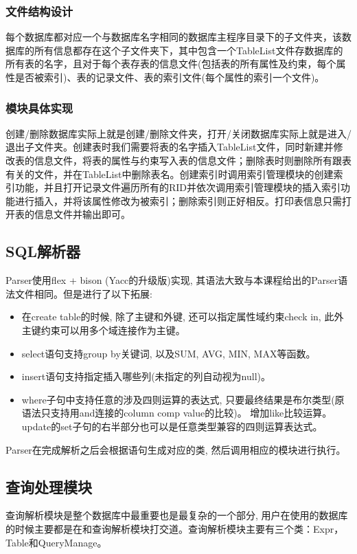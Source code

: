 \documentclass[11pt,UTF8]{report}
\begin{document}
\subsubsection{文件结构设计}

每个数据库都对应一个与数据库名字相同的数据库主程序目录下的子文件夹，该数据库的所有信息都存在这个子文件夹下，其中包含一个TableList文件存数据库的所有表的名字，且对于每个表存表的信息文件(包括表的所有属性及约束，每个属性是否被索引)、表的记录文件、表的索引文件(每个属性的索引一个文件)。
\subsubsection{模块具体实现}

创建/删除数据库实际上就是创建/删除文件夹，打开/关闭数据库实际上就是进入/退出子文件夹。创建表时我们需要将表的名字插入TableList文件，同时新建并修改表的信息文件，将表的属性与约束写入表的信息文件；删除表时则删除所有跟表有关的文件，并在TableList中删除表名。创建索引时调用索引管理模块的创建索引功能，并且打开记录文件遍历所有的RID并依次调用索引管理模块的插入索引功能进行插入，并将该属性修改为被索引；删除索引则正好相反。打印表信息只需打开表的信息文件并输出即可。
\subsection{SQL解析器}
\label{subsec:parser}
Parser使用flex + bison (Yacc的升级版)实现, 其语法大致与本课程给出的Parser语法文件相同。但是进行了以下拓展:
\begin{itemize}
	\item 在create table的时候, 除了主键和外键, 还可以指定属性域约束check in, 此外主键约束可以用多个域连接作为主键。
	\item select语句支持group by关键词, 以及SUM, AVG, MIN, MAX等函数。
	\item insert语句支持指定插入哪些列(未指定的列自动视为null)。
	\item where子句中支持任意的涉及四则运算的表达式, 只要最终结果是布尔类型(原语法只支持用and连接的column comp value的比较)。 增加like比较运算。 update的set子句的右半部分也可以是任意类型兼容的四则运算表达式。
\end{itemize}

Parser在完成解析之后会根据语句生成对应的类, 然后调用相应的模块进行执行。

\subsection{查询处理模块}
查询解析模块是整个数据库中最重要也是最复杂的一个部分, 用户在使用的数据库的时候主要都是在和查询解析模块打交道。查询解析模块主要有三个类：Expr，Table和QueryManage。
\end{document}
